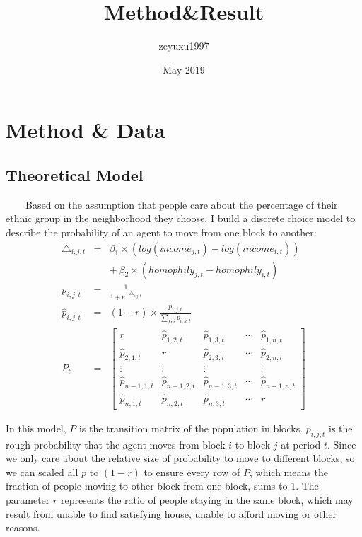 \documentclass{article}
\title{Method&Result}
\author{zeyuxu1997 }
\date{May 2019}
\begin{document}
\maketitle

\section{Method \& Data}
\subsection{Theoretical Model}
\par \ \ \ \ Based on the assumption that people care about the percentage of their ethnic group in the neighborhood they choose, I build a discrete choice model to describe the probability of an agent to move from one block to another:
\begin{eqnarray}
\triangle_{i,j,t} &=& \beta_1 \times (log(income_{j,t})-log(income_{i,t})) \nonumber\\
&\;&+\ \beta_2 \times (homophily_{j,t}-homophily_{i,t})\\ 
p_{i,j,t} &=& \frac{1}{1+e^{-\triangle_{i,j,t}}}\\
\hat{p}_{i,j,t} &=& (1-r)\times\frac{p_{i,j,t}}{\sum_{ke i} p_{i,k,t}}\\
P_t &=& 
\left[
\begin{array}{ccccc}
r & \hat{p}_{1,2,t} & \hat{p}_{1,3,t} & \cdots & \hat{p}_{1,n,t} \\
\hat{p}_{2,1,t} & r & \hat{p}_{2,3,t} & \cdots & \hat{p}_{2,n,t} \\
\vdots & \vdots & \vdots &  & \vdots \\
\hat{p}_{n-1,1,t} & \hat{p}_{n-1,2,t} & \hat{p}_{n-1,3,t} & \cdots & \hat{p}_{n-1,n,t}\\
\hat{p}_{n,1,t} & \hat{p}_{n,2,t} & \hat{p}_{n,3,t} & \cdots & r 
\end{array}
\right]
\end{eqnarray}
\par In this model, $P$ is the transition matrix of the population in blocks. $p_{i,j,t}$ is the rough probability that the agent moves from block $i$ to block $j$ at period $t$. Since we only care about the relative size of probability to move to different blocks, so we can scaled all $p$ to $(1-r)$ to ensure every row of $P$, which means the fraction of people moving to other block from one block, sums to 1. The parameter $r$ represents the ratio of people staying in the same block, which may result from unable to find satisfying house, unable to afford moving or other reasons. 
\end{document}

